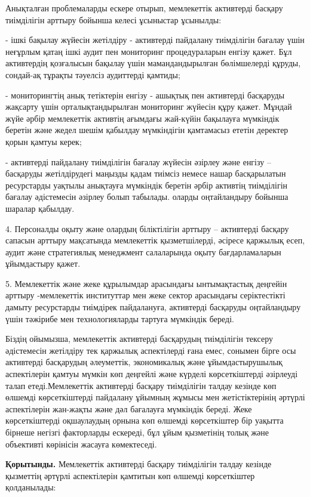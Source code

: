 Анықталған проблемаларды ескере отырып, мемлекеттік активтерді басқару
тиімділігін арттыру бойынша келесі ұсыныстар ұсынылды:

- ішкі бақылау жүйесін жетілдіру - активтерді пайдалану тиімділігін
бағалау үшін неғұрлым қатаң ішкі аудит пен мониторинг процедураларын
енгізу қажет. Бұл активтердің қозғалысын бақылау үшін мамандандырылған
бөлімшелерді құруды, сондай-ақ тұрақты тәуелсіз аудиттерді қамтиды;

- мониторингтің анық тетіктерін енгізу - ашықтық пен активтерді
басқаруды жақсарту үшін орталықтандырылған мониторинг жүйесін құру
қажет. Мұндай жүйе әрбір мемлекеттік активтің ағымдағы жай-күйін
бақылауға мүмкіндік беретін және жедел шешім қабылдау мүмкіндігін
қамтамасыз ететін деректер қорын қамтуы керек;

- активтерді пайдалану тиімділігін бағалау жүйесін әзірлеу және енгізу
-- басқаруды жетілдірудегі маңызды қадам тиімсіз немесе нашар
басқарылатын ресурстарды уақтылы анықтауға мүмкіндік беретін әрбір
активтің тиімділігін бағалау әдістемесін әзірлеу болып табылады. оларды
оңтайландыру бойынша шаралар қабылдау.

4. Персоналды оқыту және олардың біліктілігін арттыру -- активтерді
басқару сапасын арттыру мақсатында мемлекеттік қызметшілерді, әсіресе
қаржылық есеп, аудит және стратегиялық менеджмент салаларында оқыту
бағдарламаларын ұйымдастыру қажет.

5. Мемлекеттік және жеке құрылымдар арасындағы ынтымақтастық деңгейін
арттыру -мемлекеттік институттар мен жеке сектор арасындағы
серіктестікті дамыту ресурстарды тиімдірек пайдалануға, активтерді
басқаруды оңтайландыру үшін тәжірибе мен технологияларды тартуға
мүмкіндік береді.

Біздің ойымызша, мемлекеттік активтерді басқарудың тиімділігін тексеру
әдістемесін жетілдіру тек қаржылық аспектілерді ғана емес, сонымен бірге
осы активтерді басқарудың әлеуметтік, экономикалық және ұйымдастырушылық
аспектілерін қамтуы мүмкін көп деңгейлі және күрделі көрсеткіштерді
әзірлеуді талап етеді.Мемлекеттік активтерді басқару тиімділігін талдау
кезінде көп өлшемді көрсеткіштерді пайдалану ұйымның жұмысы мен
жетістіктерінің әртүрлі аспектілерін жан-жақты және дәл бағалауға
мүмкіндік береді. Жеке көрсеткіштерді оқшаулаудың орнына көп өлшемді
көрсеткіштер бір уақытта бірнеше негізгі факторларды ескереді, бұл ұйым
қызметінің толық және объективті көрінісін жасауға көмектеседі.

{\bfseries Қорытынды.} Мемлекеттік активтерді басқару тиімділігін талдау
кезінде қызметтің әртүрлі аспектілерін қамтитын көп өлшемді көрсеткіштер
қолданылады:

